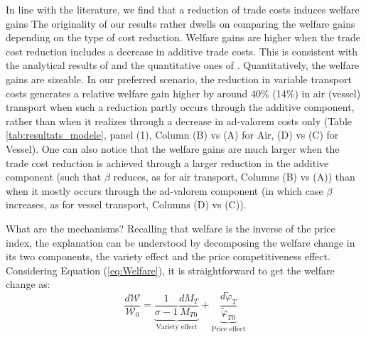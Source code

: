 \documentclass[a4paper,11pt]{article}
\begin{document}
In line with the literature, we find that a reduction of trade costs  induces welfare gains
The originality of our results rather dwells on comparing the welfare gains depending on the type of cost reduction.
Welfare gains are higher when the trade cost reduction includes a decrease in additive trade costs.
This is consistent with the analytical results of \cite{sorensen2014} and the quantitative ones of \cite{Irrazabal_2015}.
Quantitatively, the welfare gains are sizeable. In our preferred scenario, the reduction in variable transport costs generates a relative welfare gain higher by around 40\% (14\%) in air (vessel) transport when such a reduction partly occurs through the additive component, rather than when it realizes through a decrease in ad-valorem costs only (Table \ref{tab:resultats_modele}, panel (1), Column (B) vs (A) for Air, (D) vs (C) for Vessel). One can also notice that the welfare gains are much larger when the trade cost reduction is achieved through a larger reduction in the additive component (such that $\beta$ reduces, as for air transport, Columns (B) vs (A)) than when it mostly occurs through the ad-valorem component (in which case $\beta$ increases, as for vessel transport, Columns (D) vs (C)).
\smallskip

What are the mechanisms? Recalling that welfare is the inverse of the price index, the explanation can be understood by decomposing the welfare change in its two components, the variety effect and the price competitiveness effect. Considering Equation (\ref{eq:Welfare}), it is straightforward to get the welfare change as:
\begin{equation}
\frac{d\mathcal{W}}{\mathcal{W}_0} = \underbrace{\frac{1}{\sigma-1} \frac{d M_T}{M_{T0}}}_{\text{Variety effect}} +  \underbrace{\frac{d\widetilde{\varphi}_T}{\widetilde{\varphi}_{T0}}}_{\text{Price effect}} \label{eq:decompWelfare}
\end{equation}
\end{document}
